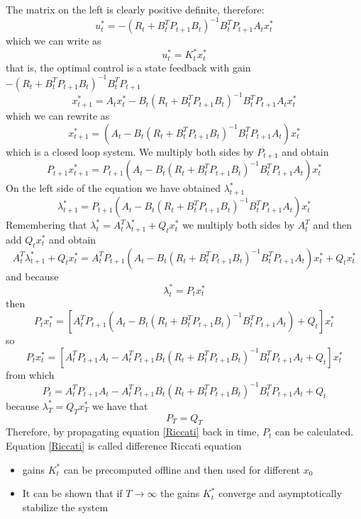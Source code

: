 \documentclass[openany]{book}
\theoremstyle{definition}
\theoremstyle{remark}
\begin{document}
The matrix on the left is clearly positive definite, therefore: 
\[
    u_t^* = -(R_t+B_t^TP_{t+1}B_t)^{-1}B_t^TP_{t+1}A_tx_t^*
\]
which we can write as 
\[
    u_t^* = K_t^*x_t^*
\]
that is, the optimal control is a state feedback with gain $-(R_t+B_t^TP_{t+1}B_t)^{-1}B_t^TP_{t+1}$
\[
    x_{t+1}^* = A_tx_t^*-B_t(R_t+B_t^TP_{t+1}B_t)^{-1}B_t^TP_{t+1}A_tx_t^*
\]
which we can rewrite as 
\[
    x_{t+1}^* = (A_t-B_t(R_t+B_t^TP_{t+1}B_t)^{-1}B_t^TP_{t+1}A_t)x_t^*
\]
which is a closed loop system. We multiply both sides by $P_{t+1}$ and obtain 
\[
    P_{t+1}x_{t+1}^* = P_{t+1}(A_t-B_t(R_t+B_t^TP_{t+1}B_t)^{-1}B_t^TP_{t+1}A_t)x_t^*
\]
On the left side of the equation we have obtained $\lambda_{t+1}^*$
\[
    \lambda_{t+1}^* =P_{t+1}(A_t-B_t(R_t+B_t^TP_{t+1}B_t)^{-1}B_t^TP_{t+1}A_t)x_t^*
\]
Remembering that $\lambda_t^* = A_t^T\lambda_{t+1}^*+Q_tx_t^*$ we multiply both sides by $A_t^T$ and then add $Q_tx^*_t$ and obtain 
\[
    A_t^T\lambda_{t+1}^*+Q_tx_t^*=A_t^TP_{t+1}(A_t-B_t(R_t+B_t^TP_{t+1}B_t)^{-1}B_t^TP_{t+1}A_t)x_t^* + Q_tx_t^*
\]
and because 
\[
    \lambda_t^* = P_tx_t^*
\]
then 
\[
    P_tx_t^* = [A_t^TP_{t+1}(A_t-B_t(R_t+B_t^TP_{t+1}B_t)^{-1}B_t^TP_{t+1}A_t)+Q_t]x_t^*
\]
so 
\[
    P_tx_t^* = \left[A_t^TP_{t+1}A_t-A_t^TP_{t+1}B_t(R_t+B_t^TP_{t+1}B_t)^{-1}B_t^TP_{t+1}A_t+Q_t\right]x_t^*
\]
from which 
\begin{equation}\label{Riccati}
    P_t = A_t^TP_{t+1}A_t-A_t^TP_{t+1}B_t(R_t+B_t^TP_{t+1}B_t)^{-1}B_t^TP_{t+1}A_t+Q_t
\end{equation}
because $\lambda_T^*=Q_Tx_T^*$ we have that 
\[
    P_T = Q_T
\]
Therefore, by propagating equation \eqref{Riccati} back in time, $P_t$ can be calculated. Equation \eqref{Riccati} is called difference Riccati equation
\begin{itemize}
    \item gains $K_t^*$ can be precomputed offline and then used for different $x_0$ 
    \item It can be shown that if $T\to\infty$ the gains $K_t^*$ converge and asymptotically stabilize the system
\end{itemize}
\end{document}
